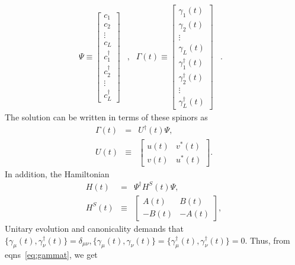 \documentclass[a4paper,10pt]{article}
\begin{document}
\begin{equation}
\label{eq:nambu:spinors}
\begin{array}{lcrcr}
 \Psi \equiv \begin{bmatrix}
            c_1\\
            c_2 \\
            \vdots \\
            c_L\\
            c^\dagger_1\\
            c^\dagger_2 \\
            \vdots\\
            c^\dagger_L
           \end{bmatrix} & , & \Gamma(t) \equiv \begin{bmatrix}
            \gamma_1(t)\\
            \gamma_2 (t)\\
            \vdots \\
            \gamma_L(t)\\
            \gamma^\dagger_1(t)\\
            \gamma^\dagger_2 (t)\\
            \vdots\\
            \gamma^\dagger_L(t)
           \end{bmatrix} & . &
           \end{array}
\end{equation}
The solution can be written in terms of these spinors as
\begin{eqnarray}
\label{eq:spinors}
\Gamma(t) &   =  & U^\dagger(t) \Psi,\nonumber \\
U(t)      &\equiv& \begin{bmatrix}         
		    u(t) & v^\ast(t)\\
		    v(t) & u^\ast(t)
		    \end{bmatrix}.
\end{eqnarray}
In addition, the Hamiltonian
\begin{eqnarray}
\label{eq:hst}
H(t)   &  =   & \Psi^\dagger H^S(t) \Psi,\nonumber \\
H^S(t) &\equiv& \begin{bmatrix}
                 A(t) & B(t)\\
                 -B(t) & -A(t)
                \end{bmatrix},
\end{eqnarray}
Unitary evolution and canonicality demands that $\{\gamma_\mu(t),\gamma^\dagger_\nu(t)\}=\delta_{\mu\nu},\{\gamma_\mu(t),\gamma_\nu(t)\}=\{\gamma^\dagger_\mu(t),\gamma^\dagger_\nu(t)\}=0$. Thus, from eqns~\ref{eq:gammat}, we get
\end{document}
